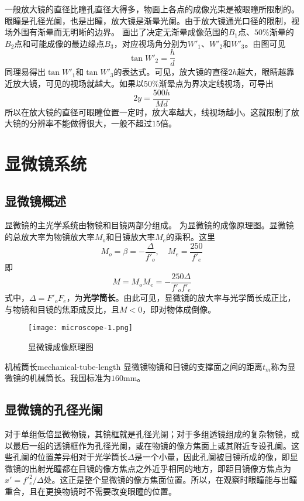 \documentclass[cn,10pt,chinesefont=founder,math=newtx,cite=super,twoside]{elegantbook}
\begin{document}
一般放大镜的直径比瞳孔直径大得多，物面上各点的成像光束是被眼瞳所限制的。眼瞳是孔径光阑，也是出瞳，放大镜是渐晕光阑。由于放大镜通光口径的限制，视场外围有渐晕而无明晰的边界。 画出了决定无渐晕成像范围的$B_1$点、$50\%$渐晕的$B_2$点和可能成像的最边缘点$B_3$，对应视场角分别为$W'_1$、$W'_2$和$W'_3$。由图可见
\begin{equation}
\tan W'_2=\frac{h}{d}
\end{equation}
同理易得出$\tan W'_1$和$\tan W'_3$的表达式。可见，放大镜的直径$2h$越大，眼睛越靠近放大镜，可见的视场就越大。如果以$50\%$渐晕点为界决定线视场，可导出
\begin{equation}
2y=\frac{500h}{Md}
\end{equation}
所以在放大镜的直径可眼瞳位置一定时，放大率越大，线视场越小。这就限制了放大镜的分辨率不能做得很大，一般不超过$15$倍。

\section{显微镜系统}
\subsection{显微镜概述}
显微镜的主光学系统由物镜和目镜两部分组成。 为显微镜的成像原理图。显微镜的总放大率为物镜放大率$M_o$和目镜放大率$M_e$的乘积。这里
\begin{equation}
M_o=\beta=-\frac{\varDelta}{f'_o},\quad M_e=\frac{250}{f'_e}
\end{equation}
即
\begin{equation}
M=M_oM_e=-\frac{250\varDelta}{f'_of'_e}
\end{equation}
式中，$\varDelta=F'_oF_e$，为\textbf{光学筒长}。由此可见，显微镜的放大率与光学筒长成正比，与物镜和目镜的焦距成反比，且$M<0$，即对物体成倒像。

\begin{figure}[htbp]
	\centering
	\texttt{[image: microscope-1.png]}
	\caption{显微镜成像原理图}
	\label{fig:microscope-1}
\end{figure}

\begin{definition}{机械筒长}{mechanical-tube-length}
	显微镜物镜和目镜的支撑面之间的距离$t_m$称为显微镜的机械筒长。我国标准为$160\mathrm{mm}$。
\end{definition}

\subsection{显微镜的孔径光阑}
对于单组低倍显微物镜，其镜框就是孔径光阑；对于多组透镜组成的复杂物镜，或以最后一组的透镜框作为孔径光阑，或在物镜的像方焦面上或其附近专设孔阑。这些孔阑的位置差异相对于光学筒长$\varDelta$是一个小量，因此孔阑被目镜所成的像，即显微镜的出射光瞳都在目镜的像方焦点之外近乎相同的地方，即距目镜像方焦点为$x'=f'^2_e/\varDelta$处。这正是整个显微镜的像方焦面位置。所以，在观察时眼瞳能与出瞳重合，且在更换物镜时不需要改变眼瞳的位置。
\end{document}
